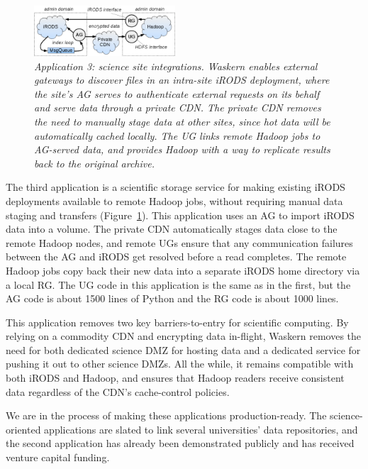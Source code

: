 \begin{figure}[t!]
\centering
\includegraphics[width=0.47\textwidth]{figures/irods-hadoop}
\caption{\it Application 3: science site integrations.  Waskern enables external
   gateways to discover files in an intra-site iRODS deployment, where the
   site's AG serves to authenticate external requests on its behalf and serve
   data through a private CDN.  The private CDN removes the need to manually
   stage data at other sites, since hot data will be automatically cached
   locally.  The UG links remote Hadoop jobs to AG-served data, and provides
   Hadoop with a way to replicate results back to the original archive.}
\label{fig:irods-hadoop}
\end{figure}

The third application is a scientific storage service for making existing iRODS
deployments available to remote Hadoop jobs, without requiring manual data
staging and transfers (Figure~\ref{fig:irods-hadoop}). This application
uses an AG to import iRODS data into a volume. The private
CDN automatically stages data close to the remote Hadoop nodes, and remote UGs
ensure that any communication failures between the AG and iRODS get resolved
before a read completes. The remote Hadoop jobs copy back their new data into a
separate iRODS home directory via a local RG. The UG code in this application is
the same as in the first, but the AG code is about 1500 lines of Python and the RG
code is about 1000 lines.

This application removes two key barriers-to-entry for scientific computing.  By
relying on a commodity CDN and encrypting data in-flight, Waskern removes the
need for both dedicated science DMZ for hosting data and a dedicated service for
pushing it out to other science DMZs.  All the while, it remains compatible with
both iRODS and Hadoop, and ensures that Hadoop readers receive consistent data
regardless of the CDN's cache-control policies.

We are in the process of making these applications production-ready.  The
science-oriented applications are slated to link several universities' data repositories, and
the second application has already been demonstrated publicly and has received venture capital funding.


